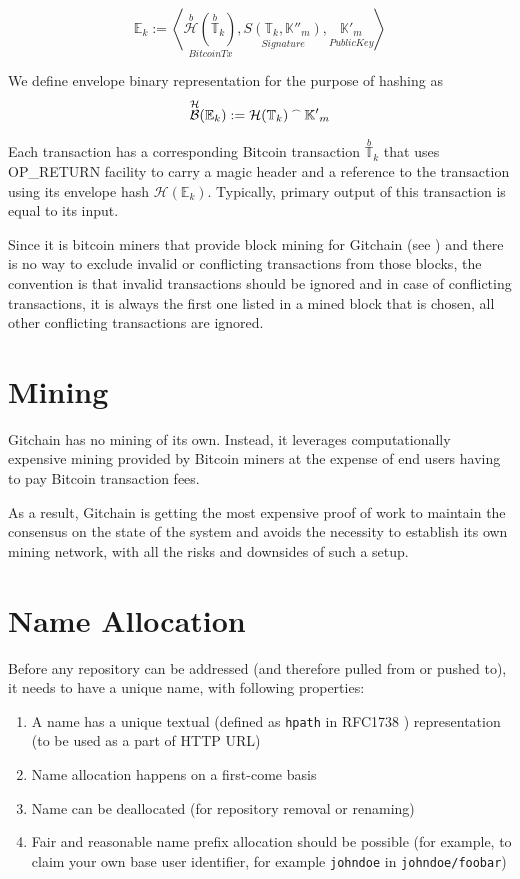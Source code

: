 \documentclass[a4paper]{article}
\newcommand{\concatA}{%
  \mathbin{\raisebox{1ex}{\scalebox{.7}{$\frown$}}}%
}
\newcommand{\Gbinhash}{\overset{\mathcal{H}}{\mathcal{B}}}
\newcommand{\Ghash}{\mathcal{H}}
\newcommand{\Gbitcoinhash}{\overset{b}{\mathcal{H}}}
\newcommand{\Gtxs}{\mathbb{T}}
\newcommand{\Gbitcointxs}{\overset{b}{\mathbb{T}}}
\newcommand{\Genvs}{\mathbb{E}}
\newcommand{\Gpubkeys}{\mathbb{K}{'}}
\newcommand{\Gprivkeys}{\mathbb{K}{''}}
\newcommand{\tuple}[1]{\ensuremath{\left \langle #1 \right \rangle }}
\begin{document}
$$
\Genvs_{k} := \tuple{\underset{BitcoinTx}{\Gbitcoinhash(\Gbitcointxs_{k})}, \underset{Signature}{S(\Gtxs_{k}, \Gprivkeys_{m})}, \underset{PublicKey}{\Gpubkeys_{m}}}
$$

We define envelope binary representation for the purpose of hashing as $$\Gbinhash(\Genvs_{k}) := \Ghash(\Gtxs_{k}) \concatA  \Gpubkeys_{m}$$

Each transaction has a corresponding Bitcoin transaction $\Gbitcointxs_{k}$ that uses \\OP\_RETURN facility to carry a magic header and a
reference to the transaction using its envelope hash $\Ghash(\Genvs_{k})$. Typically, primary output of this transaction is equal to its input.

Since it is bitcoin miners that provide block mining for Gitchain (see ) and there is no way to exclude invalid or
conflicting transactions from those blocks, the convention is that invalid transactions should be ignored and in case of conflicting
transactions, it is always the first one listed in a mined block that is chosen, all other conflicting transactions are ignored.

\section{Mining}
\label{sec:mining}

Gitchain has no mining of its own. Instead, it leverages computationally expensive mining provided by Bitcoin miners at the expense of end users having to pay Bitcoin transaction fees.

As a result, Gitchain is getting the most expensive proof of work to maintain the consensus on the state of the system and avoids the necessity to establish its own mining network, with all the risks and downsides of such a setup.


\section{Name Allocation}

Before any repository can be addressed (and therefore pulled from or pushed to), it needs to have a unique name, with following properties:

\begin{enumerate}
\item A name has a unique textual (defined as \texttt{hpath} in RFC1738 \cite{rfc1738}) representation (to be used as a part of HTTP URL)
\item Name allocation happens on a first-come basis
\item Name can be deallocated (for repository removal or renaming)
\item Fair and reasonable name prefix allocation should be possible (for example, to claim your own base user identifier, for example \texttt{johndoe} in \texttt{johndoe/foobar})
\end{enumerate}
\end{document}
